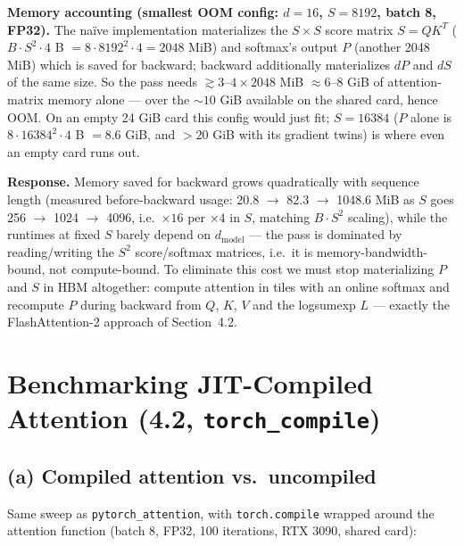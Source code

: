 \documentclass[11pt]{article}
\newcommand{\code}[1]{\texttt{#1}}
\begin{document}
\noindent\textbf{Memory accounting (smallest OOM config: $d{=}16$, $S{=}8192$, batch 8, FP32).} The
na\"ive implementation materializes the $S{\times}S$ score matrix $S = QK^T$ ($B\cdot S^2\cdot4$ B $=
8\cdot8192^2\cdot4 = 2048$ MiB) and softmax's output $P$ (another 2048 MiB) which is saved for
backward; backward additionally materializes $dP$ and $dS$ of the same size. So the pass needs
$\gtrsim 3\text{--}4 \times 2048$ MiB $\approx 6\text{--}8$ GiB of attention-matrix memory alone ---
over the ${\sim}10$ GiB available on the shared card, hence OOM. On an empty 24 GiB card this config
would just fit; $S{=}16384$ ($P$ alone is $8\cdot16384^2\cdot4$ B $= 8.6$ GiB, and $>20$ GiB with its
gradient twins) is where even an empty card runs out.

\medskip
\noindent\textbf{Response.} Memory saved for backward grows quadratically with sequence length
(measured before-backward usage: 20.8 $\to$ 82.3 $\to$ 1048.6 MiB as $S$ goes 256 $\to$ 1024 $\to$
4096, i.e.\ $\times16$ per $\times4$ in $S$, matching $B\cdot S^2$ scaling), while the runtimes at
fixed $S$ barely depend on $d_{\text{model}}$ --- the pass is dominated by reading/writing the $S^2$
score/softmax matrices, i.e.\ it is memory-bandwidth-bound, not compute-bound. To eliminate this cost
we must stop materializing $P$ and $S$ in HBM altogether: compute attention in tiles with an online
softmax and recompute $P$ during backward from $Q$, $K$, $V$ and the logsumexp $L$ --- exactly the
FlashAttention-2 approach of Section~4.2.

\section{Benchmarking JIT-Compiled Attention (4.2, \texttt{torch\_compile})}

\subsection{(a) Compiled attention vs.\ uncompiled}

Same sweep as \texttt{pytorch\_attention}, with \code{torch.compile} wrapped around the attention
function (batch 8, FP32, 100 iterations, RTX 3090, shared card):
\end{document}
